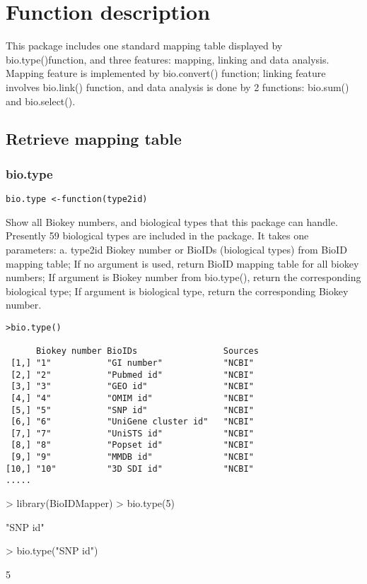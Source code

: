 \documentclass[a4paper]{article}
\begin{document}
\section{Function description} 
This package includes one standard mapping table displayed by bio.type()function, and three features: mapping, linking and data analysis. 
Mapping feature is implemented by bio.convert() function; linking feature involves bio.link() function, 
and data analysis is done by 2 functions: bio.sum() and bio.select().

\subsection{Retrieve mapping table}
\subsubsection{bio.type}
\begin{verbatim}
bio.type <-function(type2id)
\end{verbatim}
Show all Biokey numbers, and biological types that this package can handle. Presently 59 biological types are included in the package.
\newline
It takes one parameters: \newline
a. type2id \newline
Biokey number or BioIDs (biological types) from BioID mapping table; \newline
If no argument is used, return BioID mapping table for all biokey numbers;\newline
If argument is Biokey number from bio.type(), return the corresponding biological type;\newline 
If argument is biological type, return the corresponding Biokey number.\newline

\begin{verbatim}
>bio.type()

      Biokey number BioIDs                 Sources   
 [1,] "1"           "GI number"            "NCBI"    
 [2,] "2"           "Pubmed id"            "NCBI"    
 [3,] "3"           "GEO id"               "NCBI"    
 [4,] "4"           "OMIM id"              "NCBI"    
 [5,] "5"           "SNP id"               "NCBI"    
 [6,] "6"           "UniGene cluster id"   "NCBI"    
 [7,] "7"           "UniSTS id"            "NCBI"    
 [8,] "8"           "Popset id"            "NCBI"    
 [9,] "9"           "MMDB id"              "NCBI"    
[10,] "10"          "3D SDI id"            "NCBI" 
.....
\end{verbatim}
\begin{Schunk}
\begin{Sinput}
> library(BioIDMapper)
> bio.type(5)
\end{Sinput}
\begin{Soutput}
[1] "SNP id"
\end{Soutput}
\begin{Sinput}
> bio.type("SNP id")
\end{Sinput}
\begin{Soutput}
[1] 5
\end{Soutput}
\end{Schunk}
\end{document}

